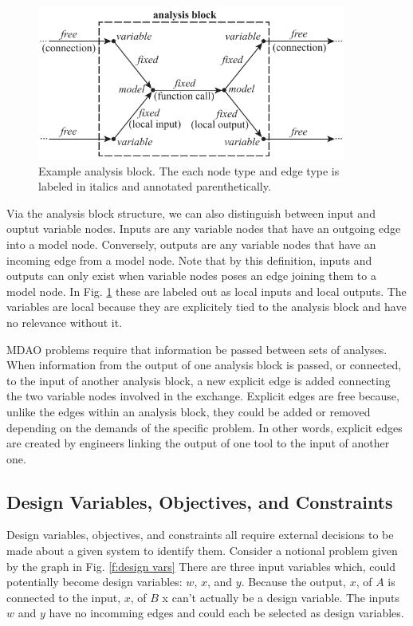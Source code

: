 \begin{figure}[htb!]
    \begin{center}
    \includegraphics[width=4in]{images/analysis_block}
    \end{center}
    \vspace{-10pt}
\caption{Example analysis block. The each node type and edge type is labeled in italics and annotated parenthetically.}
\label{f:analysis block}
\end{figure}

Via the analysis block structure, we can also distinguish between input and ouptut
variable nodes. Inputs are any variable nodes that have an outgoing edge into a model 
node. Conversely, outputs are any variable nodes that have an incoming edge from a model node. 
Note that by this definition, inputs and outputs can only exist when variable nodes poses an 
edge joining them to a model node. In Fig. \ref{f:analysis block} these are labeled out as 
local inputs and local outputs. The variables are local because they are explicitely tied
to the analysis block and have no relevance without it. 

MDAO problems require that information be passed between sets of analyses. When information from the output of one analysis 
block is passed, or connected, to the input of another analysis block, a new explicit edge is added 
connecting the two variable nodes involved in the exchange. Explicit edges are free because, unlike the edges 
within an analysis block, they could be added or removed depending on the demands of the specific problem. 
In other words, explicit edges are created by engineers linking the output of one tool to the input 
of another one. 

\subsection{Design Variables, Objectives, and Constraints}

Design variables, objectives, and constraints all require external decisions 
to be made about a given system to identify them. Consider 
a notional problem given by the graph in Fig. \ref{f:design vars} There are three input variables 
which, could potentially become design variables: $w$, $x$, and $y$. Because the output, $x$, of $A$
is connected to the input, $x$, of $B$ x can't actually be a design variable. The inputs $w$ and $y$
have no incomming edges and could each be selected as design variables. 

